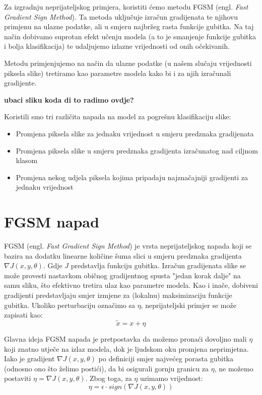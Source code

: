 Za izgradnju neprijateljskog primjera, koristiti ćemo metodu FGSM (engl. \textit{Fast Gradient Sign Method}). Ta metoda uključuje izračun gradijenata te njihovu primjenu na ulazne podatke, ali u smjeru najbržeg rasta funkcije gubitka. Na taj način dobivamo suprotan efekt učenju modela (a to je smanjenje funkcije gubitka i bolja klasifikacija) te udaljujemo izlazne vrijednosti od onih očekivanih. 

Metodu primjenjujemo na način da ulazne podatke (u našem slučaju vrijednosti piksela slike) tretiramo kao parametre modela kako bi i za njih izračunali gradijente.  

\textbf{ubaci sliku koda di to radimo ovdje? }

Koristili smo tri različita napada na model za pogrešnu klasifikaciju slike: 
\begin{itemize}
    \item Promjena piksela slike za jednaku vrijednost u smjeru predznaka gradijenata
    \item Promjena piksela slike u smjeru predznaka gradijenta izračunatog nad ciljnom klasom
    \item Promjena nekog udjela piksela kojima pripadaju najznačajniji gradijenti za jednaku vrijednost
\end{itemize}

\section{FGSM napad}

FGSM (engl. \textit{Fast Gradient Sign Method}) je vrsta neprijateljskog napada koji se bazira na dodatku linearne količine šuma slici u smjeru predznaka gradijenta $\nabla J(x, y, \theta)$. Gdje $J$ predstavlja funkciju gubitka. Izračun gradijenata slike se može provesti nastavkom običnog gradijentnog spusta "jedan korak dalje" na samu sliku, što efektivno tretira ulaz kao parametre modela. Kao i inače, dobiveni gradijenti predstavljaju smjer izmjene za (lokalnu) maksimizaciju funkcije gubitka. Ukoliko perturbaciju označimo sa $\eta$, neprijateljski primjer se može zapisati kao: 
\[\widetilde{x} = x + \eta\]

Glavna ideja FGSM napada je pretpostavka da možemo pronaći dovoljno mali $\eta$ koji znatno utječe na izlaz modela, dok je ljudskom oku promjena neprimjetna. Iako je gradijent $\nabla J(x, y, \theta)$ po definiciji smjer najvećeg porasta gubitka (odnosno ono što želimo postići), da bi osigurali gornju granicu za $\eta$, ne možemo postaviti $\eta = \nabla J(x, y, \theta)$. Zbog toga, za $\eta$ uzimamo vrijednost: 
\[\eta = \epsilon \cdot sign\left(\nabla J(x, y, \theta)\right)\]

